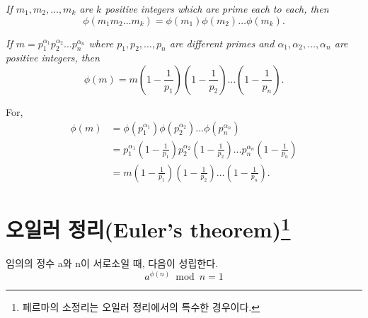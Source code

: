 \begin{corollary}

    \emph{If $m_1, m_2, \ldots, m_k$ are $k$ positive
    integers which are prime each to each, then}
    \begin{equation*}
    \phi(m_1 m_2 \ldots m_k) = \phi(m_1) \phi(m_2) \ldots \phi(m_k).
    \end{equation*}
\end{corollary}


\emph{If $m = p_1^{\alpha_1} p_2^{\alpha_2} \ldots p_n^{\alpha_n}$
where $p_1, p_2, \ldots, p_n$ are different primes and $\alpha_1,
\alpha_2, \ldots, \alpha_n$ are positive integers, then}
\begin{equation*}
\phi(m) = m \left ( 1-\frac{1}{p_1} \right )
            \left ( 1-\frac{1}{p_2} \right )
            \ldots
            \left ( 1-\frac{1}{p_n} \right ).
\end{equation*}

For,
\begin{align*}
\phi(m) &= \phi(p_1^{\alpha_1}) \phi(p_2^{\alpha_2}) \ldots
             \phi(p_n^{\alpha_n}) \\
        &= p_1^{\alpha_1} \left ( 1-\frac{1}{p_1} \right )
             p_2^{\alpha_2} \left ( 1-\frac{1}{p_2} \right )
             \ldots
             p_n^{\alpha_n} \left ( 1-\frac{1}{p_n} \right ) \\
        &= m \left ( 1-\frac{1}{p_1} \right )
             \left ( 1-\frac{1}{p_2} \right )
             \ldots
             \left ( 1-\frac{1}{p_n} \right ).
\end{align*}



\section{오일러 정리(Euler's theorem)\protect\footnote{페르마의 소정리는 오일러 정리에서의 특수한 경우이다.}}

\begin{justbox}
    \begin{theorem}
        임의의 정수 a와 n이 서로소일 때, 다음이 성립한다.
        \[a^{\phi(n)} \bmod n = 1\]
    \end{theorem}
\end{justbox}

